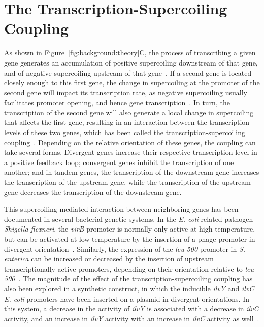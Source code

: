 \section{The Transcription-Supercoiling Coupling}

As shown in Figure~\ref{fig:background:theory}C, the process of transcribing a given gene generates an accumulation of positive supercoiling downstream of that gene, and of negative supercoiling upstream of that gene~\citep{liu1987,visser2022}.
If a second gene is located closely enough to this first gene, the change in supercoiling at the promoter of the second gene will impact its transcription rate, as negative supercoiling usually facilitates promoter opening, and hence gene transcription~\citep{forquet2021}.
In turn, the transcription of the second gene will also generate a local change in supercoiling that affects the first gene, resulting in an interaction between the transcription levels of these two genes, which has been called the transcription-supercoiling coupling~\citep{meyer2014}.
Depending on the relative orientation of these genes, the coupling can take several forms.
Divergent genes increase their respective transcription level in a positive feedback loop; convergent genes inhibit the transcription of one another; and in tandem genes, the transcription of the downstream gene increases the transcription of the upstream gene, while the transcription of the upstream gene decreases the transcription of the downstream gene.

This supercoiling-mediated interaction between neighboring genes has been documented in several bacterial genetic systems.
In the \emph{E. coli}-related pathogen \emph{Shigella flexneri}, the \emph{virB} promoter is normally only active at high temperature, but can be activated at low temperature by the insertion of a phage promoter in divergent orientation~\citep{tobe1995}.
Similarly, the expression of the \emph{leu-500} promoter in \emph{S. enterica} can be increased or decreased by the insertion of upstream transcriptionally active promoters, depending on their orientation relative to \emph{leu-500}~\citep{elhanafi2000}.
The magnitude of the effect of the transcription-supercoiling coupling has also been explored in a synthetic construct, in which the inducible \emph{ilvY} and \emph{ilvC} \emph{E. coli} promoters have been inserted on a plasmid in divergent orientations.
In this system, a decrease in the activity of \emph{ilvY} is associated with a decrease in \emph{ilvC} activity, and an increase in \emph{ilvY} activity with an increase in \emph{ilvC} activity as well~\citep{rhee1999}.

